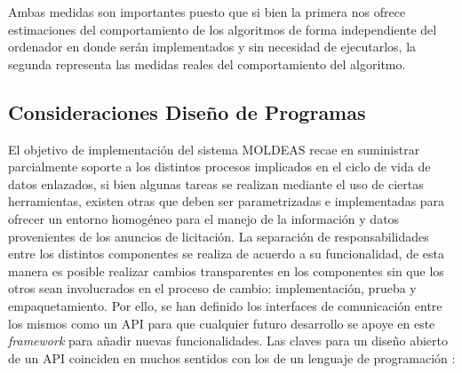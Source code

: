 Ambas medidas son importantes puesto que si bien la primera nos ofrece estimaciones
del comportamiento de los algoritmos de forma independiente del ordenador en donde serán implementados y sin necesidad de ejecutarlos, 
la segunda representa las medidas reales del comportamiento del algoritmo. 

\subsection{Consideraciones Diseño de Programas}\label{consideraciones-diseno}
El objetivo de implementación del sistema \gls{MOLDEAS} recae en suministrar parcialmente soporte 
a los distintos procesos implicados en el ciclo de vida de datos enlazados, 
si bien algunas tareas se realizan mediante el uso de ciertas herramientas, existen otras que deben ser parametrizadas e implementadas 
para ofrecer un entorno homogéneo para el manejo de la información y datos 
provenientes de los anuncios de licitación. La separación de responsabilidades 
entre los distintos componentes se realiza de acuerdo a su funcionalidad, de esta manera 
es posible realizar cambios transparentes en los componentes sin que los otros sean 
involucrados en el proceso de cambio: implementación, prueba y empaquetamiento. Por ello, 
se han definido los interfaces de comunicación entre los mismos como un API para que 
cualquier futuro desarrollo se apoye en este \textit{framework} para añadir nuevas 
funcionalidades. Las claves para un diseño abierto de un \gls{API} 
coinciden en muchos sentidos con los de un lenguaje de programación \cite{Interpretes}:

